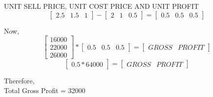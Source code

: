 \documentclass{article}
\begin{document}
\begin{itemize}
 UNIT SELL PRICE, UNIT COST PRICE AND UNIT PROFIT\\
 \[
\begin{bmatrix}
   2.5 & 1.5 & 1           
 \end{bmatrix} 
      -
 \begin{bmatrix}
        2 & 1 & 0.5
 \end{bmatrix}
 =
\begin{bmatrix}
       0.5 & 0.5 & 0.5
 \end{bmatrix} 
\]

Now,\\

\[
 \begin{bmatrix}
  16000\\
   22000\\
   26000 
 \end{bmatrix} 
  *
  \begin{bmatrix}
       0.5 & 0.5 & 0.5
 \end{bmatrix}
   =
   \begin{bmatrix}
     GROSS & PROFIT
 \end{bmatrix}
  \]
  \[
  \begin{bmatrix}
       0.5*64000
 \end{bmatrix}
  =
  \begin{bmatrix}
       GROSS & PROFIT
 \end{bmatrix}
  \] 
  
  Therefore,\\
  Total Gross Profit = 32000
  
\end{itemize}
\end{document}
